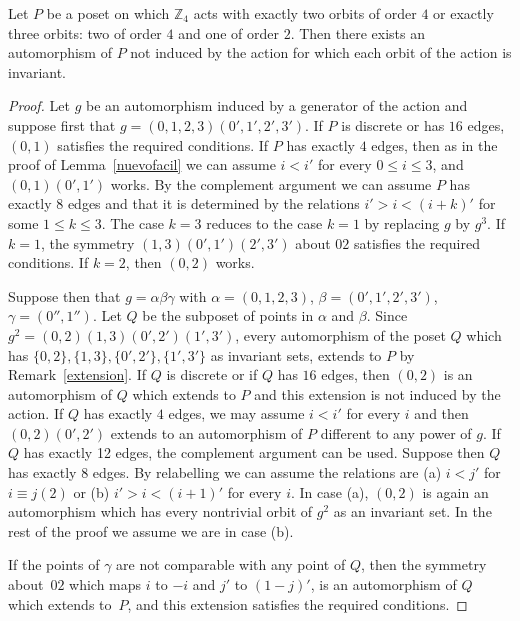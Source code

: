 \documentclass[ALCO,published]{cedram}
\newcommand{\Z}{\mathbb{Z}}
\begin{document}
\begin{lema} \label{nuevodificil}
Let $P$ be a poset on which $\Z_4$ acts with exactly two orbits of order $4$ or exactly three orbits: two  of order $4$ and one of order $2$. Then there exists an automorphism of $P$ not induced by the action for which each orbit of the action is invariant.
\end{lema}
\begin{proof}
Let $g$ be an automorphism induced by a generator of the action and suppose first that $g=(0,1,2,3)(0',1',2',3')$. If $P$ is discrete or has $16$ edges, $(0,1)$ satisfies the required conditions. If $P$ has exactly $4$ edges, then as in the proof of Lemma~\ref{nuevofacil} we can assume $i<i'$ for every $0\le i\le 3$, and $(0,1)(0',1')$ works. By the complement argument we can assume $P$ has exactly $8$ edges and that it is determined by the relations $i'>i<(i+k)'$ for some $1\le k\le 3$. The case $k=3$ reduces to the case $k=1$ by replacing $g$ by $g^3$. If $k=1$, the symmetry $(1,3)(0',1')(2',3')$ about $02$ satisfies the required conditions. If $k=2$, then $(0,2)$ works.

Suppose then that $g=\alpha \beta \gamma$ with $\alpha=(0,1,2,3)$, $\beta=(0',1',2',3')$, $\gamma=(0'',1'')$. Let $Q$ be the subposet of points in $\alpha$ and $\beta$. Since $g^2=(0,2)(1,3)(0',2')(1',3')$, every automorphism of the poset $Q$ which has $\{0,2\},\{1,3\}, \{0',2'\}, \{1',3'\}$ as invariant sets, extends to $P$ by Remark~\ref{extension}. If $Q$ is discrete or if $Q$ has $16$ edges, then $(0,2)$ is an automorphism of $Q$ which extends to $P$ and this extension is not induced by the action. If $Q$ has exactly $4$ edges, we may assume $i<i'$ for every $i$ and then $(0,2)(0',2')$ extends to an automorphism of $P$ different to any power of $g$. If $Q$ has exactly 12 edges, the complement argument can be used. Suppose then $Q$ has exactly $8$ edges. By relabelling we can assume the relations are (a) $i<j'$ for $i\equiv j (2)$ or (b) $i'>i<(i+1)'$ for every $i$. In case (a), $(0,2)$ is again an automorphism which has every nontrivial orbit of $g^2$ as an invariant set. In the rest of the proof we assume we are in case (b). 

If the points of $\gamma$ are not comparable with any point of $Q$, then the symmetry about~$02$ which maps $i$ to $-i$ and $j'$ to $(1-j)'$, is an automorphism of $Q$ which extends to~$P$, and this extension satisfies the required conditions.


\end{proof}
\end{document}
